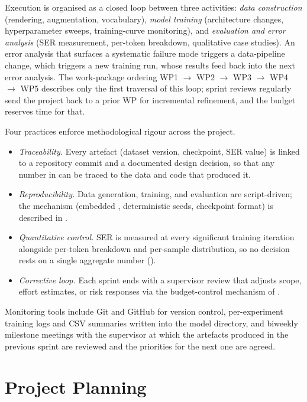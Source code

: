 Execution is organised as a closed loop between three activities:
\textit{data construction} (rendering, augmentation, vocabulary),
\textit{model training} (architecture changes, hyperparameter sweeps,
training-curve monitoring), and \textit{evaluation and error analysis}
(SER measurement, per-token breakdown, qualitative case studies).
An error analysis that surfaces a systematic failure mode triggers a
data-pipeline change, which triggers a new training run, whose results
feed back into the next error analysis.
The work-package ordering WP1 $\to$ WP2 $\to$ WP3 $\to$ WP4 $\to$ WP5
describes only the first traversal of this loop; sprint reviews
regularly send the project back to a prior WP for incremental
refinement, and the budget reserves time for that.

Four practices enforce methodological rigour across the project.
\begin{itemize}
    \item \textit{Traceability.} Every artefact (dataset version, checkpoint, SER value) is linked to a repository commit and a documented design decision, so that any number in  can be traced to the data and code that produced it.
    \item \textit{Reproducibility.} Data generation, training, and evaluation are script-driven; the mechanism (embedded , deterministic seeds, checkpoint format) is described in .
    \item \textit{Quantitative control.} SER is measured at every significant training iteration alongside per-token breakdown and per-sample distribution, so no decision rests on a single aggregate number ().
    \item \textit{Corrective loop.} Each sprint ends with a supervisor review that adjusts scope, effort estimates, or risk responses via the budget-control mechanism of .
\end{itemize}

Monitoring tools include Git and GitHub for version control,
per-experiment training logs and CSV summaries written into the
model directory, and biweekly milestone meetings with the
supervisor at which the artefacts produced in the previous
sprint are reviewed and the priorities for the next one are
agreed.

\section{Project Planning}
\label{sec:mgmt-planning}

